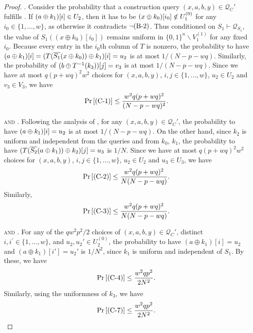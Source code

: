 \begin{proof}
\smallskip
\noindent \textsc{\cone}. Consider the probability that a construction query $(x,a,b,y)\in\mathcal{Q}_C'$ fulfills \cone. If $(a\oplus k_1)[i]\in U_2$, then it has to be $(x\oplus k_0)[i_0]\notin U_1^{(0)}$ for any $i_0\in\{1,\ldots,w\}$, as otherwise it contradicts $\neg\text{(B-2)}$. Thus conditioned on $S_{1} \vdash \mathcal{Q}_{S_{1}}$, the value of $S_1((x \oplus k_0)[i_0])$ remains uniform in $\{0, 1\}^{n} \backslash V_1^{(1)}$ for any fixed $i_0$. Because every entry in the $i_{0}$th column of $T$ is nonzero, the probability to have $(a\oplus k_1)[i]=(T(\overline{S_1}(x\oplus k_0))\oplus k_1)[i]=u_2$ is at most $1/(N-p-wq)$. Similarly, the probability of $(b\oplus T^{-1}(k_3))[j] = v_3$ is at most $1/(N-p-wq)$. Since we have at most $q(p+wq)^2w^2$ choices for $(x,a,b,y)$, $i, j \in\{1, \ldots, w\}$, $u_{2} \in U_{2}$ and $v_{3} \in V_{3}$, we have
%
%
$$
\operatorname{Pr}\left[\text{(C-1)}\right] \leq \frac{w^{2} q (p+w q)^{2}}{(N-p-wq)^{2}}.
$$



\smallskip
\noindent \textsc{\ctwo and \cthree}. Following the analysis of \cone, for any $(x,a,b,y)\in\mathcal{Q}_C'$, the probability to have $(a\oplus k_1)[i]=u_2$ is at most $1/(N-p-wq)$. On the other hand, since $k_{2}$ is uniform and independent from the queries and from $k_{0}$, $k_{1}$, the probability to have $(T(\overline{S_2}(a \oplus k_1))\oplus k_2)[j] = u_3$ is $1/N$. Since we have at most $q(p+wq)^2w^2$ choices for $(x,a,b,y)$, $i, j \in\{1, \ldots, w\}$, $u_{2} \in U_{2}$ and $u_{3} \in U_{3}$, we have
%
%
$$
\operatorname{Pr}\left[\text{(C-2)}\right] \leq \frac{w^{2} q (p+w q)^{2}}{N  (N-p-wq)}.
$$
%
Similarly,
%
$$
\operatorname{Pr}\left[\text{(C-3)}\right] \leq \frac{w^{2} q (p+w q)^{2}}{N  (N-p-wq)}.
$$




\smallskip
\noindent \textsc{\cfour and \cseven}. For any of the $qw^2p^2/2$ choices of $(x,a,b,y)\in\mathcal{Q}_C'$, distinct $i, i^{\prime}\in\{1, \ldots, w\}$, and $u_{2},u_{2}' \in U_{2}^{(0)}$, the probability to have $(a \oplus k_1)[i] = u_2$ and $(a \oplus k_1)[i'] = u_2'$ is $1/N^2$, since $k_1$ is uniform and independent of $S_1$. By these, we have
%
$$
\operatorname{Pr}\left[\text{(C-4)}\right] \leq \frac{w^2qp^2}{2N^2}.
$$
Similarly, using the uniformness of $k_3$, we have
%
$$
\operatorname{Pr}\left[\text{(C-7)}\right] \leq \frac{w^2qp^2}{2N^2}.
$$




%
%
%
%
%











\end{proof}
